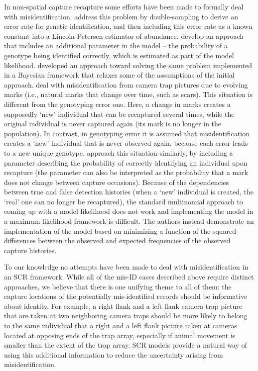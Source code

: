 In non-spatial capture recapture some efforts have been made to
formally deal with misidentification. \citet{stevick_etal:2001}
address this problem by double-sampling to derive an error rate for
genetic identification, and then including this error rate as a known
constant into a Lincoln-Petersen estimator of
abundance. \citet{lukacs_burnham:2005} develop an approach that
includes an additional parameter in the model -- the probability of a
genotype being identified correctly, which is estimated as part of the
model likelihood. \citet{link_etal:2010} developed an approach toward
solving the same problem implemented in a Bayesian framework that
relaxes some of the assumptions of the initial approach.
\citet{yoshizaki_etal:2009} deal with misidentification from camera
trap pictures due to evolving marks (i.e., natural marks that change
over time, such as scars). This situation is different from the
genotyping error one. Here, a change in marks creates a supposedly
`new' individual that can be recaptured several times, while the
original individual is never captured again (its mark is no longer in
the population). In contrast, in genotyping error it is assumed that
misidentification creates a `new' individual that is never observed
again, because each error leads to a new unique
genotype. \citet{yoshizaki_etal:2009} approach this situation
similarly, by including a parameter describing the probability of
correctly identifying an individual upon recapture (the parameter can
also be interpreted as the probability that a mark does not change
between capture occasions). Because of the dependencies between true
and false detection histories (when a `new' individual is created, the
`real' one can no longer be recaptured), the standard multinomial
approach to coming up with a model likelihood does not work and
implementing the model in a maximum likelihood framework is
difficult. The authors instead demonstrate an implementation of the
model based on minimizing a function of the squared differences
between the observed and expected frequencies of the observed capture
histories.

To our knowledge no attempts have been made to deal with
misidentification in an SCR framework. While all of the mis-ID cases
described above require distinct approaches, we believe that there is
one unifying theme to all of them: the capture locations of the 
potentially mis-identified records should be informative about
identity.  For example, a right flank and a left flank camera trap
picture that are taken at two neighboring camera traps should be 
more likely to belong to the same individual that a right and a left
flank picture taken at cameras located at opposing ends of the trap
array, especially if animal movement is smaller than the extent of the
trap array.  SCR models provide a natural way of using this additional
information to reduce the uncertainty arising from misidentification.

